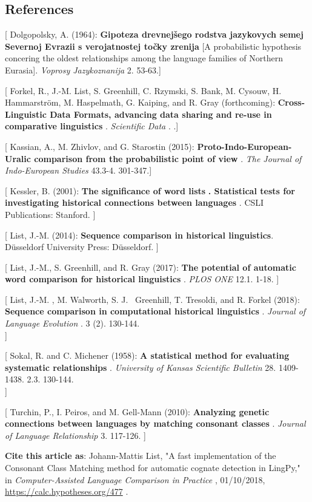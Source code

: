 \documentclass[
  english,
  a4paper,
  oneside,tablecaptionabove
]{scrbook}
\begin{document}
\hypertarget{references-1}{%
\subsection*{References}\label{references-1}}

{[} Dolgopolsky, A. (1964): \textbf{Gipoteza drevnejšego rodstva
jazykovych semej Severnoj Evrazii s verojatnostej točky zrenija} {[}A
probabilistic hypothesis concering the oldest relationships among the
language families of Northern Eurasia{]}. \emph{Voprosy Jazykoznanija}
2. 53-63.{]}

{[} Forkel, R., J.-M. List, S. Greenhill, C. Rzymski, S. Bank, M.
Cysouw, H. Hammarström, M. Haspelmath, G. Kaiping, and R. Gray
(forthcoming): \textbf{Cross-Linguistic Data Formats, advancing data
sharing and re-use in comparative linguistics} . \emph{Scientific Data}
. .{]}

{[} Kassian, A., M. Zhivlov, and G. Starostin (2015):
\textbf{Proto-Indo-European-Uralic comparison from the probabilistic
point of view} . \emph{The Journal of Indo-European Studies} 43.3-4.
301-347.{]}

{[} Kessler, B. (2001): \textbf{The significance of word lists}
\textbf{. Statistical tests for investigating historical connections
between languages} . CSLI Publications: Stanford. {]}

{[} List, J.-M. (2014): \textbf{Sequence comparison in historical
linguistics}. Düsseldorf University Press: Düsseldorf. {]}

{[} List, J.-M., S. Greenhill, and R. Gray (2017): \textbf{The potential
of automatic word comparison for historical linguistics} . \emph{PLOS
ONE} 12.1. 1-18. {]}

{[} List, J.-M. , M. Walworth, S. J.~ Greenhill, T. Tresoldi, and R.
Forkel (2018): \textbf{Sequence comparison in computational historical
linguistics} . \emph{Journal of Language Evolution} . 3 (2). 130-144.\\
{]}

{[} Sokal, R. and C. Michener (1958): \textbf{A statistical method for
evaluating systematic relationships} . \emph{University of Kansas
Scientific Bulletin} 28. 1409-1438. 2.3. 130-144.\\
{]}

{[} Turchin, P., I. Peiros, and M. Gell-Mann (2010): \textbf{Analyzing
genetic connections between languages by matching consonant classes} .
\emph{Journal of Language Relationship} 3. 117-126. {]}

\textbf{Cite this article as}: Johann-Mattis List, "A fast
implementation of the Consonant Class Matching method for automatic
cognate detection in LingPy," in \emph{Computer-Assisted Language
Comparison in Practice} , 01/10/2018,
\url{https://calc.hypotheses.org/477} .
\end{document}
